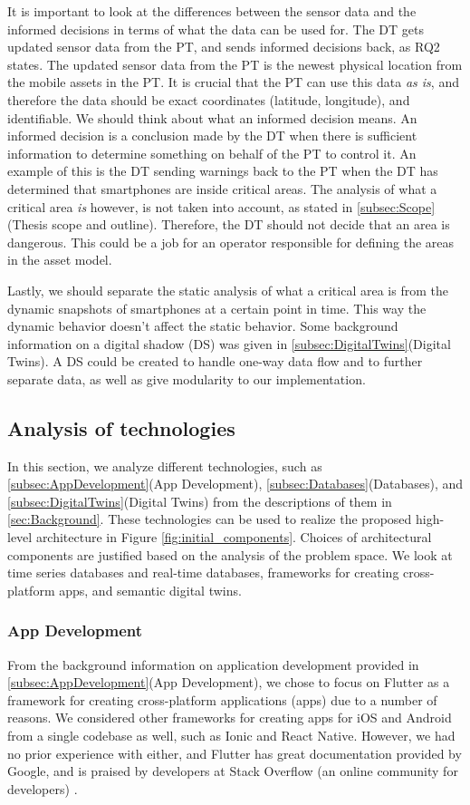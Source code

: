 \documentclass{article}
\begin{document}
It is important to look at the differences between the sensor data and the informed decisions in terms of what the data can be used for. The DT gets updated sensor data from the PT, and sends informed decisions back, as RQ2 states. The updated sensor data from the PT is the newest physical location from the mobile assets in the PT. It is crucial that the PT can use this data \emph{as is}, and therefore the data should be exact coordinates (latitude, longitude), and identifiable. We should think about what an informed decision means. An informed decision is a conclusion made by the DT when there is sufficient information to determine something on behalf of the PT to control it. An example of this is the DT sending warnings back to the PT when the DT has determined that smartphones are inside critical areas. The analysis of what a critical area \emph{is} however, is not taken into account, as stated in \ref{subsec:Scope}(Thesis scope and outline). Therefore, the DT should not decide that an area is dangerous. This could be a job for an operator responsible for defining the areas in the asset model. 

Lastly, we should separate the static analysis of what a critical area is from the dynamic snapshots of smartphones at a certain point in time. This way the dynamic behavior doesn't affect the static behavior. Some background information on a digital shadow (DS) was given in \ref{subsec:DigitalTwins}(Digital Twins). A DS could be created to handle one-way data flow and to further separate data, as well as give modularity to our implementation.

\subsection{Analysis of technologies}
In this section, we analyze different technologies, such as \ref{subsec:AppDevelopment}(App Development), \ref{subsec:Databases}(Databases), and \ref{subsec:DigitalTwins}(Digital Twins) from the descriptions of them in \ref{sec:Background}. These technologies can be used to realize the proposed high-level architecture in Figure \ref{fig:initial_components}. Choices of architectural components are justified based on the analysis of the problem space. We look at time series databases and real-time databases, frameworks for creating cross-platform apps, and semantic digital twins.

\subsubsection{App Development}\label{subsubsection:AppDevelopment}
From the background information on application development provided in \ref{subsec:AppDevelopment}(App Development), we chose to focus on Flutter as a framework for creating cross-platform applications (apps) due to a number of reasons. We considered other frameworks for creating apps for iOS and Android from a single codebase as well, such as Ionic and React Native. However, we had no prior experience with either, and Flutter has great documentation provided by Google, and is praised by developers at Stack Overflow (an online community for developers) \cite{noauthor_why_nodate}.
\end{document}
